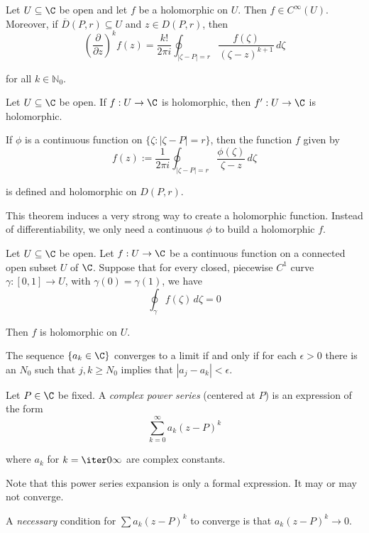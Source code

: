 Let $U\subseteq\C$ be open and let $f$ be a holomorphic on $U$. Then $f\in
C^\infty(U)$. Moreover, if $\overline D(P,r)\subseteq U$ and $z\in D(P,r)$,
then
$$
  \left(\frac\partial{\partial z}\right)^kf(z)=\frac{k!}{2\pi i}
  \oint_{|\zeta-P|=r}\frac{f(\zeta)}{(\zeta-z)^{k+1}}\,d\zeta
$$

for all $k\in\mathbb{N}_0$.

\label{ee189cf}

Let $U\subseteq\C$ be open. If $f:U\to\C$ is holomorphic, then $f':U\to\C$ is
holomorphic.

\label{c056da0}

If $\phi$ is a continuous function on $\{\zeta:|\zeta-P|=r\}$, then the
function $f$ given by
$$
  f(z):=\frac1{2\pi i}\oint_{|\zeta-P|=r}\frac{\phi(\zeta)}{\zeta-z}\,d\zeta
$$

is defined and holomorphic on $D(P,r)$.

This theorem induces a very strong way to create a holomorphic function.
Instead of differentiability, we only need a continuous $\phi$ to build a
holomorphic $f$.

\label{f378992}

Let $U\subseteq\C$ be open. Let $f:U\to\C$ be a continuous function on a
connected open subset $U$ of $\C$. Suppose that for every closed, piecewise
$C^1$ curve $\gamma:[0,1]\to U$, with $\gamma(0)=\gamma(1)$, we have
$$\oint_\gamma f(\zeta)\,d\zeta=0$$

Then $f$ is holomorphic on $U$.

\label{db44655}

The sequence $\{a_k\in\C\}$ converges to a limit if and only if for each
$\epsilon>0$ there is an $N_0$ such that $j,k\geq N_0$ implies that
$|a_j-a_k|<\epsilon$.

\label{b9a7c59}

Let $P\in\C$ be fixed. A \textit{complex power series} (centered at $P$) is an
expression of the form
$$
  \sum_{k=0}^\infty a_k(z-P)^k
$$

where $a_k$ for $k=\iter0\infty$ are complex constants.

Note that this power series expansion is only a formal expression. It may or
may not converge.

A \textit{necessary} condition for $\sum a_k(z-P)^k$ to converge is that
$a_k(z-P)^k\to0$.

